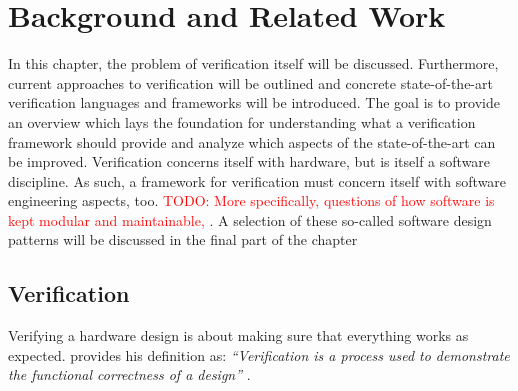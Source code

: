 \documentclass[11pt,a4paper]{report}
\newcommand{\todo}[1]{\textcolor{red}{TODO: #1}}
\begin{document}
\chapter{Background and Related Work} %
\label{ch:background}


In this chapter, the problem of verification itself will be discussed. Furthermore, current approaches to verification will be outlined and concrete state-of-the-art verification languages and frameworks will be introduced. The goal is to provide an overview which lays the foundation for understanding what a verification framework should provide and analyze which aspects of the state-of-the-art can be improved. Verification concerns itself with hardware, but is itself a software discipline. As such, a framework for verification must concern itself with software engineering aspects, too. \todo{More specifically, questions of how software is kept modular and maintainable, }. A selection of these so-called software design patterns will be discussed in the final part of the chapter 

\section{Verification} %

Verifying a hardware design is about making sure that everything works as expected. \citeauthor{bergeron2012writing}
provides his definition as: \textit{``Verification is a process used to demonstrate the functional correctness of a
design''} \cite[Ch. 1]{bergeron2012writing}.
\end{document}
